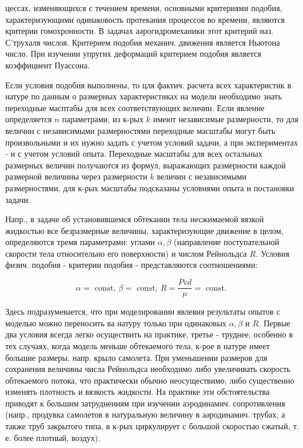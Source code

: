 \documentclass[10pt]{article}
\begin{document}
цессах, изменяющихся с течением времени, основными критериями подобия, характеризующими одинаковость протекания процессов во времени, являются критерии гомохронности. В задачах аәрогидромеханики этот критерий наз. С'трухаля числоя. Критерием подобия механич. движения является Ньютона число. При изучении упругих деформаций критерием подобия является коэффициент Пуассона.



Если условия подобия выполнены, то цля фактич. расчета всех характеристик в натуре по данным о размерных характеристиках на модели необходимо знать переходные масптабы для всех соответствующих величин. Если явление определяется $n$ параметрами, из к-рых $k$ имеют независимые размерности, то для величин с независимыми размерностями переходные масштабы могут быть произвольными и их нужно задать с учетом условий задачи, а при экспериментах - и с учетом условий опыта. Переходные масштабы для всех остальных размерных величин получаются из формул, выражающих размерности каждой размерной величины через размерности $k$ величин с независимыми размерностями, для к-рых масштабы подсказаны условиями опыта и постановки задачи.



Напр., в задаче об установившемся обтекании тела несжимаемой вязкой жидкостью все безразмерные величины, характеризующие движение в целом, определяются тремя параметрами: углами $\alpha, \beta$ (направление поступательной скорости тела относительно его поверхности) и числом Рейнольдса $R$. Условия физич. подобия - критерии подобия - представляются соотношениями:



\[

\alpha=\text { const, } \beta=\text { const, } R=\frac{P v d}{\mu}=\text { const. }

\]



Здесь подразумевается, что при моделировании явлевия результаты опытов с моделью можно переносить ва натуру только при одинаковых $\alpha, \beta$ и $R$. Первые два условия всегда легко осуществить на практике, третье - труднее, особенно в тех случаях, когда модель меньше обтекаемого тела, к-рое в натуре имеет большие размеры, напр. крыло самолета. При уменышении размеров для сохранения величины числа Рейнольдса необходимо либо увеличивать скорость обтекаемого потока, что практически обычно неосуществимо, либо существенно изменять плотность и вязкость жидкости. На практике эти обстоятельства приводят к большим затруднениям при изучении аэродинамич. сопротивления (напр., продувка самолетов в натуральную величину в аәродинамич. трубах, а также труб закрытого типа, в к-рых циркулирует с большой скоростью сжатый, т. е. более плотный, воздух).
\end{document}

